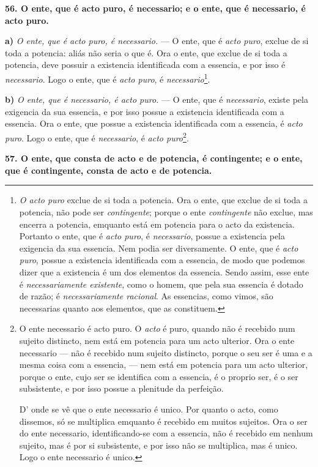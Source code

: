  \textbf{56. O ente, que é acto puro, é necessario; e o ente, que é necessario, é acto puro.}

\textbf{a)} \emph{O ente, que é acto puro, é necessario.} --- O ente, que é \emph{acto puro}, exclue de si toda a potencia: aliás não seria o que é. Ora o ente, que exclue de si toda a potencia, deve possuir a existencia identificada com a essencia, e por isso é \emph{necessario}. Logo o ente, que é \emph{acto puro}, é \emph{necessario}\footnote{\emph{O acto puro} exclue de si toda a potencia. Ora o ente, que exclue de si toda a potencia, não pode ser \emph{contingente}; porque o ente \emph{contingente} não exclue, mas encerra a potencia, emquanto está em potencia para o acto da existencia. Portanto o ente, que é \emph{acto puro}, é \emph{necessario}, possue a existencia pela exigencia da sua essencia. Nem podia ser diversamente. O ente, que é \emph{acto puro}, possue a existencia identificada com a essencia, de modo que podemos dizer que a existencia é um dos elementos da essencia. Sendo assim, esse ente é \emph{necessariamente existente}, como o homem, que pela sua essencia é dotado de razão; é \emph{necessariamente racional}. As essencias, como vimos, são necessarias quanto aos elementos, que as constituem.}.

\textbf{b)} \emph{O ente, que é necessario, é acto puro.} --- O ente, que é \emph{necessario}, existe pela exigencia da sua essencia, e por isso possue a existencia identificada com a essencia. Ora o ente, que possue a existencia identificada com a essencia, é \emph{acto puro}. Logo o ente, que é \emph{necessario}, é \emph{acto puro}\footnote{O ente necessario é acto puro. O \emph{acto} é puro, quando não é recebido num sujeito distincto, nem está em potencia para um acto ulterior. Ora o ente necessario --- não é recebido num sujeito distincto, porque o seu ser é uma e a mesma coisa com a essencia, --- nem está em potencia para um acto ulterior, porque o ente, cujo ser se identifica com a essencia, é o proprio ser, é o ser subsistente, e por isso possue a plenitude da perfeição.\par D' onde se vê que o ente necessario é unico. Por quanto o acto, como dissemos, só se multiplica emquanto é recebido em muitos sujeitos. Ora o ser do ente necessario, identificando-se com a essencia, não é recebido em nenhum sujeito, mas é por si subsistente, e por isso não se multiplica, mas é unico. Logo o ente necessario é unico.}.

\textbf{57. O ente, que consta de acto e de potencia, é contingente; e o ente, que é contingente, consta de acto e de potencia.}

